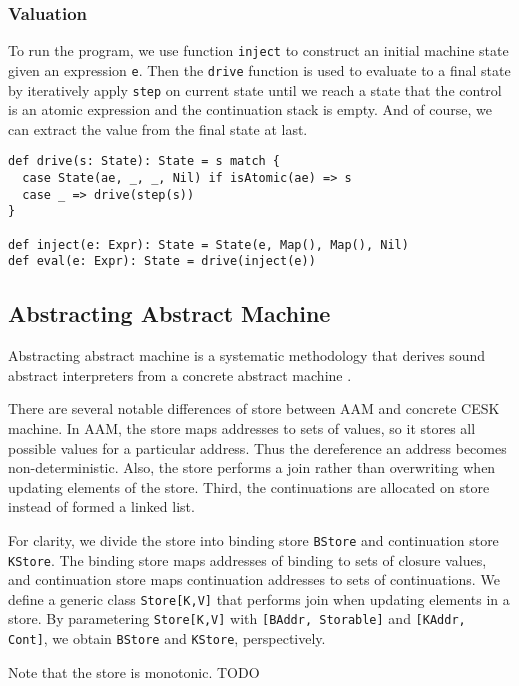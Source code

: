 \documentclass[acmsmall,review,anonymous]{acmart}\settopmatter{printfolios=true,printccs=false,printacmref=false}
\begin{document}
\subsubsection{Valuation}

To run the program, we use function \texttt{inject} to construct an initial machine
state given an expression \texttt{e}.
Then the \texttt{drive} function is used to evaluate
to a final state by iteratively apply \texttt{step} on current state until we reach a state
that the control is an atomic expression and the continuation stack is empty.
And of course, we can extract the value from the final state at last.

\begin{verbatim}
def drive(s: State): State = s match {
  case State(ae, _, _, Nil) if isAtomic(ae) => s
  case _ => drive(step(s))
}

def inject(e: Expr): State = State(e, Map(), Map(), Nil)
def eval(e: Expr): State = drive(inject(e))
\end{verbatim}

\subsection{Abstracting Abstract Machine} \label{aam}
Abstracting abstract machine is a systematic methodology that derives sound abstract interpreters
from a concrete abstract machine \cite{van2012systematic, van2010abstracting}. 

There are several notable differences of store between AAM and concrete CESK machine.
In AAM, the store maps addresses to sets of values, so it stores all possible values
for a particular address. Thus the dereference an address becomes non-deterministic.
Also, the store performs a join rather than overwriting when updating elements of the store.
Third, the continuations are allocated on store instead of formed a linked list.

For clarity, we divide the store into binding store \texttt{BStore} and continuation store \texttt{KStore}. 
The binding store maps addresses of binding to sets of closure values, and continuation store maps
continuation addresses to sets of continuations.
We define a generic class \texttt{Store[K,V]} that performs join when updating elements
in a store. By parametering \texttt{Store[K,V]} with \texttt{[BAddr, Storable]} and 
\texttt{[KAddr, Cont]}, we obtain \texttt{BStore} and \texttt{KStore}, perspectively.

Note that the store is monotonic. TODO
\end{document}

